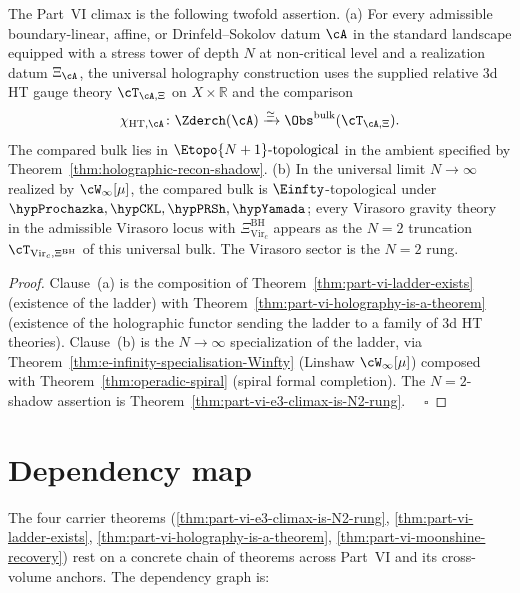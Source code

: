 \begin{proposition}
\label{prop:part-vi-climax-restated}
The Part~VI climax is the following twofold assertion.
\textup{(}a\textup{)} For every admissible boundary-linear, affine, or
Drinfeld--Sokolov datum $\cA$ in the standard landscape equipped with a
stress tower of depth $N$ at non-critical level and a realization
datum \(\Xi_\cA\), the universal holography construction uses the
supplied relative 3d HT gauge theory
$\cT_{\cA,\Xi}$ on $X \times \mathbb{R}$ and the comparison
\[
\chi_{\mathrm{HT},\cA}\colon
\Zderch(\cA)\xrightarrow{\simeq}
\Obs^{\mathrm{bulk}}(\cT_{\cA,\Xi}).
\]
The compared bulk lies in
\(\Etopo{N+1}\text{-topological}\) in the ambient specified by
Theorem~\ref{thm:holographic-recon-shadow}.
\textup{(}b\textup{)} In the universal limit $N \to \infty$ realized by
$\cW_\infty[\mu]$, the compared bulk is $\Einfty$-topological under
\(\hypProchazka,\hypCKL,\hypPRSh,\hypYamada\); every
Virasoro gravity theory in the admissible Virasoro locus with
\(\Xi_{\mathrm{Vir}_c}^{\mathrm{BH}}\) appears as the $N=2$
truncation $\cT_{\mathrm{Vir}_c,\Xi^{\mathrm{BH}}}$ of this universal
bulk. The Virasoro sector is the $N=2$ rung.
\end{proposition}
\begin{proof}
Clause~(a) is the composition of
Theorem~\ref{thm:part-vi-ladder-exists} (existence of the ladder) with
Theorem~\ref{thm:part-vi-holography-is-a-theorem} (existence of the
holographic functor sending the ladder to a family of 3d HT theories).
Clause~(b) is the $N \to \infty$ specialization of the ladder, via
Theorem~\ref{thm:e-infinity-specialisation-Winfty} (Linshaw
$\cW_\infty[\mu]$) composed with
Theorem~\ref{thm:operadic-spiral} (spiral formal completion). The
$N=2$-shadow assertion is
Theorem~\ref{thm:part-vi-e3-climax-is-N2-rung}. $\quad\square$
\end{proof}

\section{Dependency map}
\label{sec:part-vi-dependency-map}

The four carrier theorems
(\ref{thm:part-vi-e3-climax-is-N2-rung},
\ref{thm:part-vi-ladder-exists},
\ref{thm:part-vi-holography-is-a-theorem},
\ref{thm:part-vi-moonshine-recovery}) rest on a concrete chain of
theorems across Part~VI and its cross-volume anchors. The
dependency graph is:

